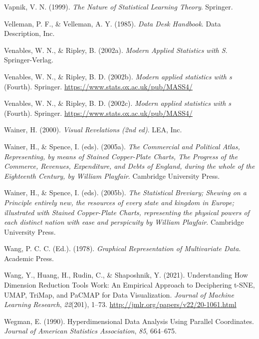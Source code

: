 \documentclass[
  letterpaper,
]{krantz}
\newlength{\cslhangindent}
\newenvironment{CSLReferences}[2] %
 {\begin{list}{}{%
  \setlength{\itemindent}{0pt}
  \setlength{\leftmargin}{0pt}
  \setlength{\parsep}{0pt}
  \ifodd #1
   \setlength{\leftmargin}{\cslhangindent}
   \setlength{\itemindent}{-1\cslhangindent}
  \fi
  \setlength{\itemsep}{#2\baselineskip}}}
 {\end{list}}
\begin{document}
\begin{CSLReferences}{1}{0}
Vapnik, V. N. (1999). \emph{The {N}ature of {S}tatistical {L}earning
{T}heory}. Springer.

Velleman, P. F., \& Velleman, A. Y. (1985). \emph{Data {D}esk
{H}andbook}. Data Description, Inc.

Venables, W. N., \& Ripley, B. (2002a). \emph{Modern {A}pplied
{S}tatistics with {S}}. Springer-Verlag.

Venables, W. N., \& Ripley, B. D. (2002b). \emph{Modern applied
statistics with s} (Fourth). Springer.
\url{https://www.stats.ox.ac.uk/pub/MASS4/}

Venables, W. N., \& Ripley, B. D. (2002c). \emph{Modern applied
statistics with s} (Fourth). Springer.
\url{https://www.stats.ox.ac.uk/pub/MASS4/}

Wainer, H. (2000). \emph{Visual {R}evelations (2nd ed)}. LEA, Inc.

Wainer, H., \& Spence, I. (eds). (2005a). \emph{The {C}ommercial and
{P}olitical {A}tlas, {R}epresenting, by means of {S}tained
{C}opper-{P}late {C}harts, {T}he {P}rogress of the {C}ommerce,
{R}evenues, {E}xpenditure, and {D}ebts of {E}ngland, during the whole of
the {E}ighteenth {C}entury, by {W}illiam {P}layfair}. Cambridge
University Press.

Wainer, H., \& Spence, I. (eds). (2005b). \emph{The {S}tatistical
{B}reviary; {S}hewing on a {P}rinciple entirely new, the resources of
every state and kingdom in {E}urope; illustrated with {S}tained
{C}opper-{P}late {C}harts, representing the physical powers of each
distinct nation with ease and perspicuity by {W}illiam {P}layfair}.
Cambridge University Press.

Wang, P. C. C. (Ed.). (1978). \emph{{G}raphical {R}epresentation of
{M}ultivariate {D}ata}. Academic Press.

Wang, Y., Huang, H., Rudin, C., \& Shaposhnik, Y. (2021). Understanding
{H}ow {D}imension {R}eduction {T}ools {W}ork: An {E}mpirical {A}pproach
to {D}eciphering {t-SNE}, {UMAP}, {TriMap}, and {PaCMAP} for {D}ata
{V}isualization. \emph{Journal of Machine Learning Research},
\emph{22}(201), 1--73. \url{http://jmlr.org/papers/v22/20-1061.html}

Wegman, E. (1990). {H}yperdimensional {D}ata {A}nalysis {U}sing
{P}arallel {C}oordinates. \emph{Journal of American Statistics
Association}, \emph{85}, 664--675.


\end{CSLReferences}
\end{document}
